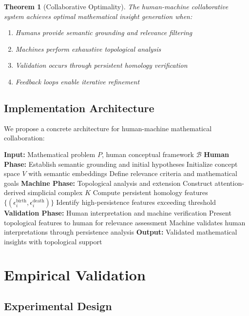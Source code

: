 \documentclass[11pt]{article}
\newtheorem{theorem}{Theorem}[section]
\newcommand{\B}{\mathcal{B}}
\begin{document}
\begin{theorem}[Collaborative Optimality]
The human-machine collaborative system achieves optimal mathematical insight generation when:
\begin{enumerate}
\item Humans provide semantic grounding and relevance filtering
\item Machines perform exhaustive topological analysis
\item Validation occurs through persistent homology verification
\item Feedback loops enable iterative refinement
\end{enumerate}
\end{theorem}

\subsection{Implementation Architecture}

We propose a concrete architecture for human-machine mathematical collaboration:

\begin{algorithm}
\caption{Collaborative Mathematical Insight Generation}
\begin{algorithmic}[1]
\STATE \textbf{Input:} Mathematical problem $P$, human conceptual framework $\B$
\STATE \textbf{Human Phase:} Establish semantic grounding and initial hypotheses
\STATE Initialize concept space $V$ with semantic embeddings
\STATE Define relevance criteria and mathematical goals
\STATE \textbf{Machine Phase:} Topological analysis and extension
\STATE Construct attention-derived simplicial complex $K$
\STATE Compute persistent homology features $\{(\epsilon_i^{\text{birth}}, \epsilon_i^{\text{death}})\}$
\STATE Identify high-persistence features exceeding threshold
\STATE \textbf{Validation Phase:} Human interpretation and machine verification
\STATE Present topological features to human for relevance assessment
\STATE Machine validates human interpretations through persistence analysis
\STATE \textbf{Output:} Validated mathematical insights with topological support
\end{algorithmic}
\end{algorithm}

\section{Empirical Validation}

\subsection{Experimental Design}
\end{document}
